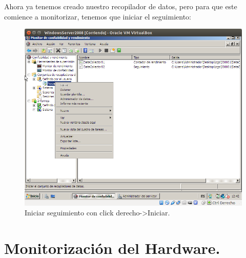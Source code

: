 \begin{itemize}
		Ahora ya tenemos creado nuestro recopilador de datos, pero para que este comience a monitorizar, tenemos que iniciar el seguimiento:\\
		\begin{figure}[H]
		\centering
		\includegraphics[width=0.6\linewidth]{seguimiento}
		\caption[Seguimiento]{Iniciar seguimiento con click derecho->Iniciar.}
		\label{fig:seguimiento}
		\end{figure}


		
		



		
		





		
\end{itemize}

\section{Monitorización del Hardware.}


